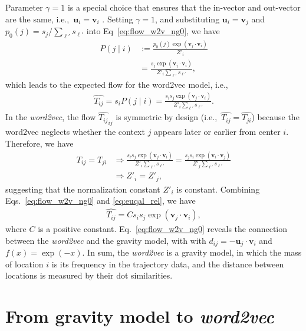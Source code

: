 \documentclass[12pt]{article} %
\def\given{\mid}
\def\ie{i.e.,~}
\begin{document}
Parameter $\gamma=1$ is a special choice that ensures that the in-vector and out-vector are the same, \ie $\bm{u}_i = \bm{v}_i$ \autocite{levy2014neural}.
Setting $\gamma = 1$, and substituting $\bm{u}_i = \bm{v}_j$ and $p_0(j) = s_j / \sum_{\ell'} s_{\ell'}$ into Eq~\eqref{eq:flow_w2v_ng0}, we have
\begin{align}
    P\left(j \given i \right) & := \frac{ p_0 (j) \exp(\bm{v}_j \cdot \bm{v}_{i})}{ Z'_i}                      \\
                              & =  \frac{s _j  \exp(\bm{v}_j \cdot \bm{v}_{i})}{ Z' _i\sum_{\ell'} s_{\ell'}},
\end{align}
which leads to the expected flow for the word2vec model, \ie
\begin{align}
    \hat{T_{ij}}=s_i P(j\given i) =  \frac{s_i s _j  \exp(\bm{v}_j \cdot \bm{v}_{i})}{  Z'_i\sum_{\ell'} s_{\ell'}}. \label{eq:flow_w2v_ng0}
\end{align}
In the \textit{word2vec}, the flow $\hat{T_{ij}}_{ij}$ is symmetric by design (\ie $\hat{T_{ij}}=\hat{T_{ji}}$) because the word2vec neglects whether the context $j$ appears later or earlier from center $i$.
Therefore, we have
\begin{align}
    T_{ij} = T_{ji}
     & \Rightarrow
    \frac{s_i s _j  \exp(\bm{v}_j \cdot \bm{v}_{i})}{  Z'_i\sum_{\ell'} s_{\ell'}} =  \frac{s_j s _i  \exp(\bm{v}_i \cdot \bm{v}_{j})}{  Z'_j\sum_{\ell'} s_{\ell'}} \\
     & \Rightarrow
    Z'_i = Z'_j, \label{eq:euqal_rel}
\end{align}
suggesting that the normalization constant $Z' _i$ is constant.
Combining Eqs.~\eqref{eq:flow_w2v_ng0} and \eqref{eq:euqal_rel}, we have
\begin{align}
    \hat{T_{ij}}=  C s_i s _j  \exp(\bm{v}_j \cdot \bm{v}_{i}),
\end{align}
where $C$ is a positive constant.
Eq.~\eqref{eq:flow_w2v_ng0} reveals the connection between the \textit{word2vec} and the gravity model, with with $d_{ij} = - \bm{u}_{j} \cdot \bm{v}_{i}$ and $f(x) = \exp(-x)$.
In sum, the \textit{word2vec} is a gravity model, in which the mass of location $i$ is its frequency in the trajectory data, and the distance between locations is measured by their dot similarities.

\section{From gravity model to \textit{word2vec}}
\label{sec:from_gravity_to_word2vec}
\end{document}
